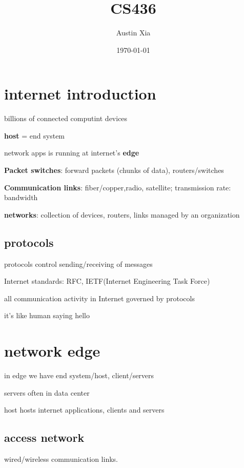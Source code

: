 \documentclass[10pt]{article}
\theoremstyle{break}
\begin{document}
\let\ref\Cref

\title{\bf{CS436}}
\date{\today}
\author{Austin Xia}

\maketitle
\newpage
\tableofcontents
\listoffigures
\listoftables
\newpage
\section{internet introduction}
billions of connected computint devices 

\textbf{host} = end system 

network apps is running at internet's \textbf{edge}

\textbf{Packet switches}: forward packets (chunks of data), routers/switches

\textbf{Communication links}: fiber/copper,radio, satellite;  transmission rate: bandwidth

\textbf{networks}: collection of devices, routers, links managed by an organization

\subsection{protocols}
protocols control sending/receiving of messages

Internet standards: RFC, IETF(Internet Engineering Task Force)

all communication activity in Internet governed by protocols

it's like human saying hello

\section{network edge}
in edge we have end system/host, client/servers 

servers often in data center

host hosts internet applications, clients and servers 

\subsection{access network}
wired/wireless communication links. 
\end{document}
